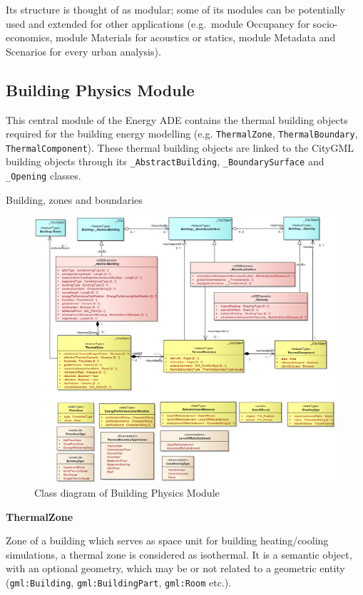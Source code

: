 \documentclass[a4paper,12pt]{article}
\begin{document}
Its structure is thought of as modular; some of its modules can be
potentially used and extended for other applications (e.g.~module
Occupancy for socio-economics, module Materials for acoustics or
statics, module Metadata and Scenarios for every urban analysis).

\subsection{Building Physics Module}\label{building-physics-module}

This central module of the Energy ADE contains the thermal building
objects required for the building energy modelling (e.g.
\texttt{ThermalZone}, \texttt{ThermalBoundary},
\texttt{ThermalComponent}). These thermal building objects are linked to
the CityGML building objects through its \texttt{\_AbstractBuilding},
\texttt{\_BoundarySurface} and \texttt{\_Opening} classes.

Building, zones and boundaries

\begin{figure}[htbp]
\centering
\includegraphics{fig/class_geometry.png}
\caption{Class diagram of Building Physics Module}
\end{figure}

\textbf{ThermalZone}

Zone of a building which serves as space unit for building
heating/cooling simulations, a thermal zone is considered as isothermal.
It is a semantic object, with an optional geometry, which may be or not
related to a geometric entity (\texttt{gml:Building},
\texttt{gml:BuildingPart}, \texttt{gml:Room} etc.).
\end{document}
